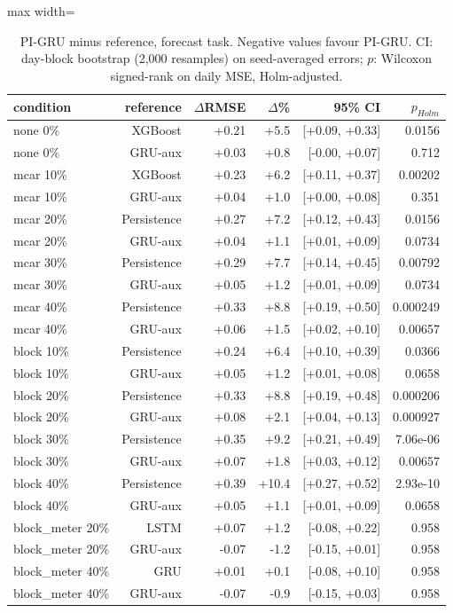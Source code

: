 \begin{table}[H]
\centering\small
\caption{PI-GRU minus reference, forecast task. Negative values favour PI-GRU. CI: day-block bootstrap (2,000 resamples) on seed-averaged errors; $p$: Wilcoxon signed-rank on daily MSE, Holm-adjusted.}\label{tab:sig_forecast}
\begin{adjustbox}{max width=\textwidth}
\begin{tabular}{lrrrrr}
\toprule
condition & reference & $\Delta$RMSE & $\Delta$\% & 95\% CI & $p_{Holm}$ \\
\midrule
none 0\% & XGBoost & +0.21 & +5.5 & [+0.09, +0.33] & 0.0156 \\
none 0\% & GRU-aux & +0.03 & +0.8 & [-0.00, +0.07] & 0.712 \\
mcar 10\% & XGBoost & +0.23 & +6.2 & [+0.11, +0.37] & 0.00202 \\
mcar 10\% & GRU-aux & +0.04 & +1.0 & [+0.00, +0.08] & 0.351 \\
mcar 20\% & Persistence & +0.27 & +7.2 & [+0.12, +0.43] & 0.0156 \\
mcar 20\% & GRU-aux & +0.04 & +1.1 & [+0.01, +0.09] & 0.0734 \\
mcar 30\% & Persistence & +0.29 & +7.7 & [+0.14, +0.45] & 0.00792 \\
mcar 30\% & GRU-aux & +0.05 & +1.2 & [+0.01, +0.09] & 0.0734 \\
mcar 40\% & Persistence & +0.33 & +8.8 & [+0.19, +0.50] & 0.000249 \\
mcar 40\% & GRU-aux & +0.06 & +1.5 & [+0.02, +0.10] & 0.00657 \\
block 10\% & Persistence & +0.24 & +6.4 & [+0.10, +0.39] & 0.0366 \\
block 10\% & GRU-aux & +0.05 & +1.2 & [+0.01, +0.08] & 0.0658 \\
block 20\% & Persistence & +0.33 & +8.8 & [+0.19, +0.48] & 0.000206 \\
block 20\% & GRU-aux & +0.08 & +2.1 & [+0.04, +0.13] & 0.000927 \\
block 30\% & Persistence & +0.35 & +9.2 & [+0.21, +0.49] & 7.06e-06 \\
block 30\% & GRU-aux & +0.07 & +1.8 & [+0.03, +0.12] & 0.00657 \\
block 40\% & Persistence & +0.39 & +10.4 & [+0.27, +0.52] & 2.93e-10 \\
block 40\% & GRU-aux & +0.05 & +1.1 & [+0.01, +0.09] & 0.0658 \\
block\_meter 20\% & LSTM & +0.07 & +1.2 & [-0.08, +0.22] & 0.958 \\
block\_meter 20\% & GRU-aux & -0.07 & -1.2 & [-0.15, +0.01] & 0.958 \\
block\_meter 40\% & GRU & +0.01 & +0.1 & [-0.08, +0.10] & 0.958 \\
block\_meter 40\% & GRU-aux & -0.07 & -0.9 & [-0.15, +0.03] & 0.958 \\
\bottomrule
\end{tabular}
\end{adjustbox}
\end{table}
